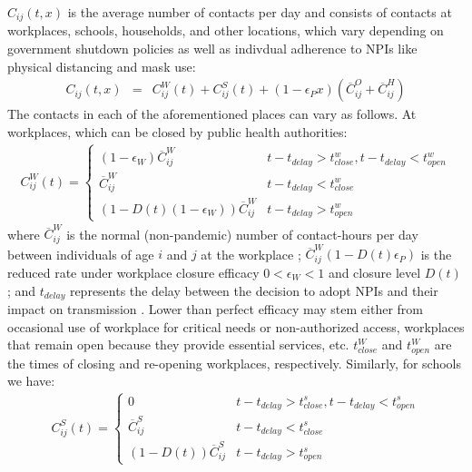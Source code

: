 $C_{ij}(t,x)$ is the average number of contacts per day and consists of contacts at workplaces, schools, households, and other locations, which vary depending on government shutdown policies as well as indivdual adherence to NPIs like physical distancing and mask use: 
\begin{eqnarray}
C_{ij}(t,x) &= & C^W_{ij}(t) + C^S_{ij}(t) + (1 - \epsilon_P x ) (\overline{C}^O_{ij} + \overline{C}^H_{ij} )
\label{cij_eqn}
\end{eqnarray}
The contacts in each of the aforementioned places can vary as follows. At workplaces, which can be closed by public health authorities: 
\begin{eqnarray}
C^W_{ij}(t) =  \left\{
\begin{array}{ll}
      (1 - \epsilon_W) \overline{C}^W_{ij} & t - t_{delay} >t^w_{close}, t  - t_{delay}< t^w_{open} \\ 
      \overline{C}^W_{ij} &  t - t_{delay}<t^w_{close} \\
       
       (1 - D(t)(1 - \epsilon_W)) \overline{C}^W_{ij} & t - t_{delay}> t^w_{open}
\end{array} 
\label{cw_eqn}
\right. 
\end{eqnarray}
where $\overline{C}^W_{ij}$ is the normal (non-pandemic) number of contact-hours per day between individuals of age $i$ and $j$ at the workplace \cite{zagheni2008using}; $\overline{C}^W_{ij} (1 - D(t)\epsilon_P)$ is the reduced rate under workplace closure efficacy $0 < \epsilon_W< 1$ and closure level $D(t)$; and $t_{delay}$ represents the delay between the decision to adopt NPIs and their impact on transmission \cite{li2020temporal}. Lower than perfect efficacy may stem either from occasional use of workplace for critical needs or non-authorized access, workplaces that remain open because they provide essential services, etc. $t^W_{close}$ and $t^W_{open}$ are the times of closing and re-opening workplaces, respectively. Similarly, for schools we have: 
\begin{eqnarray}
  C^S_{ij}(t) =  \left\{
\begin{array}{ll}
      0 & t - t_{delay}>t^s_{close}, t - t_{delay} < t^s_{open} \\ 
      \overline{C}^S_{ij} &  t - t_{delay}<t^s_{close} \\
       
      (1 - D(t)) \overline{C}^S_{ij} & t - t_{delay} > t^s_{open}
\end{array} 
\right. 
\label{cs_eqn}
\end{eqnarray}
